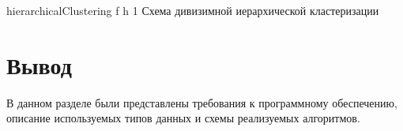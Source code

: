 {hierarchicalClustering} %
{f} %
{h} %
{1\textwidth} %
{Схема дивизимной иерархической кластеризации} %
\clearpage

\fi

\section *{Вывод}

В данном разделе были представлены требования к программному обеспечению, описание используемых типов данных и схемы реализуемых алгоритмов.
